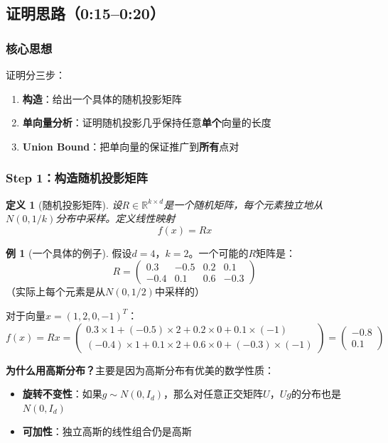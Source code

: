 \documentclass[11pt,a4paper]{ctexart}
\newtheorem{definition}[theorem]{定义}
\theoremstyle{definition}
\newtheorem{example}[theorem]{例}
\theoremstyle{remark}
\begin{document}
\subsection{证明思路（0:15--0:20）}

\subsubsection{核心思想}

证明分三步：
\begin{enumerate}
    \item \textbf{构造}：给出一个具体的随机投影矩阵
    \item \textbf{单向量分析}：证明随机投影几乎保持任意\textbf{单个}向量的长度
    \item \textbf{Union Bound}：把单向量的保证推广到\textbf{所有}点对
\end{enumerate}

\subsubsection{Step 1：构造随机投影矩阵}

\begin{definition}[随机投影矩阵]
设$R \in \mathbb{R}^{k \times d}$是一个随机矩阵，每个元素独立地从$N(0, 1/k)$分布中采样。定义线性映射
\[
f(x) = Rx
\]
\end{definition}

\begin{example}[一个具体的例子]
假设$d = 4$，$k = 2$。一个可能的$R$矩阵是：
\[
R = \begin{pmatrix}
0.3 & -0.5 & 0.2 & 0.1 \\
-0.4 & 0.1 & 0.6 & -0.3
\end{pmatrix}
\]
（实际上每个元素是从$N(0, 1/2)$中采样的）

对于向量$x = (1, 2, 0, -1)^T$：
\[
f(x) = Rx = \begin{pmatrix}
0.3 \times 1 + (-0.5) \times 2 + 0.2 \times 0 + 0.1 \times (-1) \\
(-0.4) \times 1 + 0.1 \times 2 + 0.6 \times 0 + (-0.3) \times (-1)
\end{pmatrix} = \begin{pmatrix}
-0.8 \\
0.1
\end{pmatrix}
\]
\end{example}

\textbf{为什么用高斯分布？}主要是因为高斯分布有优美的数学性质：
\begin{itemize}
    \item \textbf{旋转不变性}：如果$g \sim N(0, I_d)$，那么对任意正交矩阵$U$，$Ug$的分布也是$N(0, I_d)$
    \item \textbf{可加性}：独立高斯的线性组合仍是高斯
\end{itemize}
\end{document}
